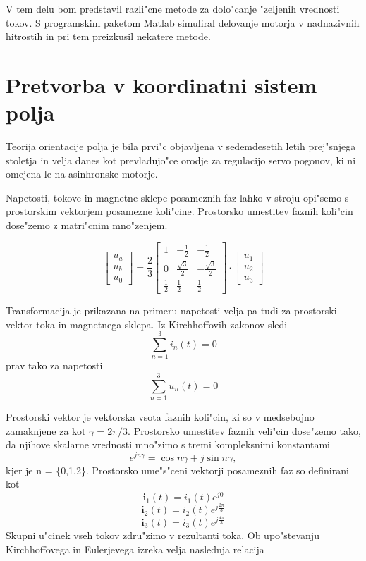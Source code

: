 \documentclass[journal,a4paper,twoside]{sty/IEEEtran}
\begin{document}
V tem delu bom predstavil razli"cne metode za dolo"canje "zeljenih vrednosti tokov.
S programskim paketom Matlab simuliral delovanje motorja v nadnazivnih hitrostih in pri tem preizkusil nekatere metode.
\section{Pretvorba v koordinatni sistem polja}

Teorija orientacije polja je bila prvi"c objavljena v sedemdesetih letih prej"snjega stoletja in velja danes kot prevladujo"ce orodje za regulacijo servo pogonov, ki ni omejena le na asinhronske motorje.

Napetosti, tokove in magnetne sklepe posameznih faz lahko v stroju opi"semo s prostorskim vektorjem posamezne koli"cine. 
Prostorsko umestitev faznih koli"cin dose"zemo z matri"cnim mno"zenjem.

$$\begin{bmatrix}
u_a\\u_b\\u_0
\end{bmatrix}=
\frac{2}{3}
\begin{bmatrix} 1 & -\frac{1}{2} & -\frac{1}{2} \\ 0 & \frac{\sqrt{3}}{2} & -\frac{\sqrt{3}}{2}\\ \frac{1}{2} &\frac{1}{2} &\frac{1}{2} \end{bmatrix}\cdot
\begin{bmatrix}
u_{1}\\u_{2}\\u_{3}
\end{bmatrix}$$

Transformacija je prikazana na primeru napetosti velja pa tudi za prostorski vektor toka in magnetnega sklepa.
Iz Kirchhoffovih zakonov sledi \begin{equation}
\sum_{n=1}^3 i_n(t)=0
\end{equation} prav tako za napetosti \begin{equation}
\sum_{n=1}^3 u_n(t)=0
\end{equation}



Prostorski vektor je vektorska vsota faznih koli"cin, ki so v medsebojno zamaknjene za kot  $\gamma=2 \pi/3$. Prostorsko umestitev faznih veli"cin dose"zemo tako, da njihove skalarne vrednosti mno"zimo s tremi kompleksnimi konstantami$$e^{j n \gamma}=\cos n \gamma +j \sin n \gamma,$$ kjer je n = \{0,1,2\}. Prostorsko ume"s"ceni vektorji posameznih faz so definirani kot
$$\textbf{i}_1(t)=i_1(t) e^{j 0} $$ 
$$\textbf{i}_2(t)=i_2(t) e^{j \frac{2\pi}{3}} $$ 
$$\textbf{i}_3(t)=i_3(t) e^{j \frac{4\pi}{3}} $$
Skupni u"cinek vseh tokov zdru"zimo v rezultanti toka. Ob upo"stevanju Kirchhoffovega in Eulerjevega izreka velja naslednja relacija
\end{document}

